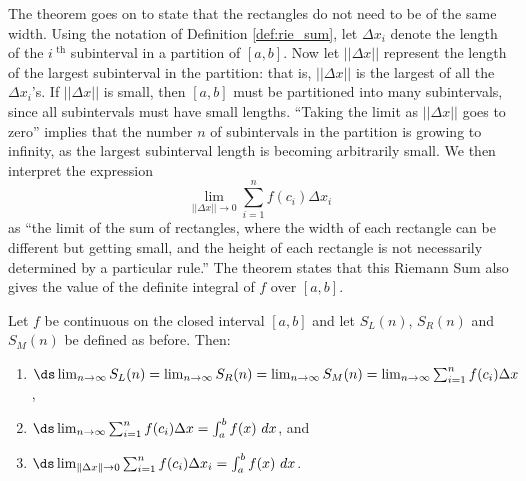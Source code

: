 The theorem goes on to state that the rectangles do not need to be of the same width. Using the notation of Definition \ref{def:rie_sum}, let $\Delta x_i$ denote the length of the $i^\text{ th}$ subinterval in a partition of $[a,b]$. Now let $||\Delta x||$ represent the length of the largest subinterval in the partition: that is, $||\Delta x||$ is the largest of all the $\Delta x_i$'s. If $||\Delta x||$ is small, then $[a,b]$ must be partitioned into many subintervals, since all subintervals must have small lengths. ``Taking the limit as $||\Delta x||$ goes to zero'' implies that the number $n$ of subintervals in the partition is growing to infinity, as the largest subinterval length is becoming arbitrarily small. We then interpret the expression 
$$\lim_{||\Delta x||\to 0}\sum_{i=1}^nf(c_i)\Delta x_i$$
as ``the limit of the sum of rectangles, where the width of each rectangle can be different but getting small, and the height of each rectangle is not necessarily determined by a particular rule.'' The theorem states that this Riemann Sum also gives the value of the definite integral of $f$ over $[a,b]$.


{Let $f$ be continuous on the closed interval $[a,b]$  and let $S_L(n)$, $S_R(n)$ and $S_M(n)$ be defined as before. Then:
\begin{enumerate}
	\item		$\ds \lim_{n\to\infty} S_L(n) = \lim_{n\to\infty} S_R(n) = \lim_{n\to\infty} S_M(n) = \lim_{n\to\infty}\sum_{i=1}^n f(c_i)\Delta x$, 
	
	\item		$\ds \lim_{n\to\infty}\sum_{i=1}^n f(c_i)\Delta x = \int_a^b f(x)\ dx$, and %
	\item		$\ds \lim_{\|\Delta x\|\to 0} \sum_{i=1}^n f(c_i)\Delta x_i = \int_a^b f(x)\ dx$.%
\end{enumerate}
}

